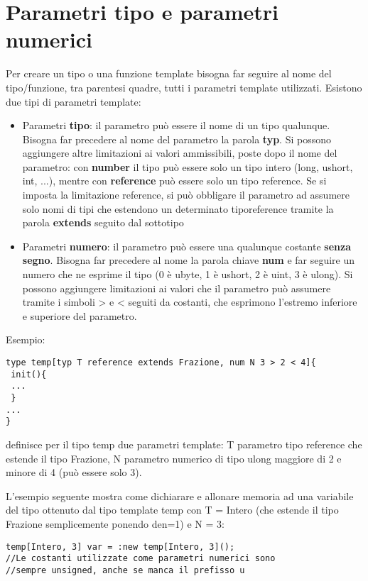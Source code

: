 \documentclass[10pt]{book}%
\newcommand{\e}{\`{e} }
\newcommand{\ac}[1]{\`{#1}}
\renewcommand{\emph}[1]{\textbf{#1}}
\newenvironment{codeenv}{
\begin{mdframed}[backgroundcolor=black!20,topline=false,leftline=false,rightline=false,bottomline=false]
}
{\end{mdframed}}
\begin{document}
\section{Parametri tipo e parametri numerici}
Per creare un tipo o una funzione template bisogna far seguire al nome del tipo/funzione, tra parentesi quadre, tutti i parametri template utilizzati. Esistono due tipi di parametri template:
\begin{itemize}
\item Parametri \emph{tipo}: il parametro pu\ac o essere il nome di un tipo qualunque. Bisogna far precedere al nome del parametro la parola \emph{typ}. Si possono aggiungere altre limitazioni ai valori ammissibili, poste dopo il nome del parametro: con \emph{number} il tipo pu\ac o essere solo un tipo intero (long, ushort, int, ...), mentre con \emph{reference} pu\ac o essere solo un tipo reference. Se si imposta la limitazione reference, si pu\ac o obbligare il parametro ad assumere solo nomi di tipi che estendono un determinato tiporeference tramite la parola \emph{extends} seguito dal sottotipo
\item Parametri \emph{numero}: il parametro pu\ac o essere una qualunque costante \emph{senza segno}. Bisogna far precedere al nome la parola chiave \emph{num} e far seguire un numero che ne esprime il tipo (0 \e ubyte, 1 \e ushort, 2 \e uint, 3 \e ulong). Si possono aggiungere limitazioni ai valori che il parametro pu\ac o assumere tramite i simboli > e < seguiti da costanti, che esprimono l'estremo inferiore e superiore del parametro.
\end{itemize}
Esempio:
\begin{codeenv}
\begin{verbatim}
type temp[typ T reference extends Frazione, num N 3 > 2 < 4]{
 init(){
 ...
 }
...
}
\end{verbatim}
\end{codeenv}
definisce per il tipo temp due parametri template: T parametro tipo reference che estende il tipo Frazione, N parametro numerico di tipo ulong maggiore di 2 e minore di 4 (pu\ac o essere solo 3).

L'esempio seguente mostra come dichiarare e allonare memoria ad una variabile del tipo ottenuto dal tipo template temp con T = Intero (che estende il tipo Frazione semplicemente ponendo den=1) e N = 3:
\begin{codeenv}
\begin{verbatim}
temp[Intero, 3] var = :new temp[Intero, 3]();
//Le costanti utilizzate come parametri numerici sono 
//sempre unsigned, anche se manca il prefisso u
\end{verbatim}
\end{codeenv}
\end{document}
